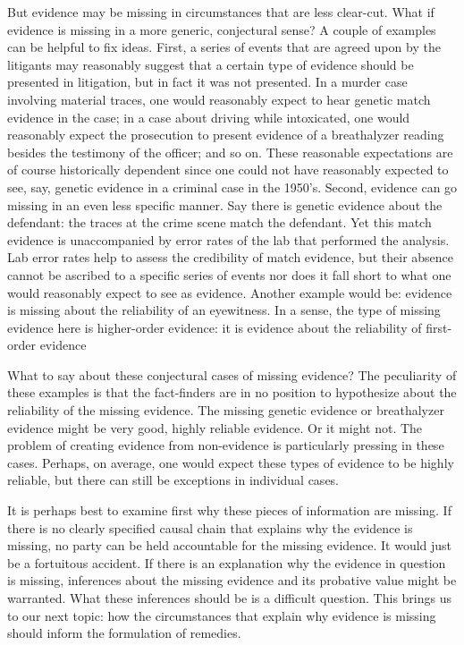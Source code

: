 \documentclass[
  10pt,
  dvipsnames,enabledeprecatedfontcommands]{scrartcl}
\begin{document}
But evidence may be missing in circumstances that are less clear-cut.
What if evidence is missing in a more generic, conjectural sense? A
couple of examples can be helpful to fix ideas. First, a series of
events that are agreed upon by the litigants may reasonably suggest that
a certain type of evidence should be presented in litigation, but in
fact it was not presented. In a murder case involving material traces,
one would reasonably expect to hear genetic match evidence in the case;
in a case about driving while intoxicated, one would reasonably expect
the prosecution to present evidence of a breathalyzer reading besides
the testimony of the officer; and so on. These reasonable expectations
are of course historically dependent since one could not have reasonably
expected to see, say, genetic evidence in a criminal case in the 1950's.
Second, evidence can go missing in an even less specific manner. Say
there is genetic evidence about the defendant: the traces at the crime
scene match the defendant. Yet this match evidence is unaccompanied by
error rates of the lab that performed the analysis. Lab error rates help
to assess the credibility of match evidence, but their absence cannot be
ascribed to a specific series of events nor does it fall short to what
one would reasonably expect to see as evidence. Another example would
be: evidence is missing about the reliability of an eyewitness. In a
sense, the type of missing evidence here is higher-order evidence: it is
evidence about the reliability of first-order evidence

What to say about these conjectural cases of missing evidence? The
peculiarity of these examples is that the fact-finders are in no
position to hypothesize about the reliability of the missing evidence.
The missing genetic evidence or breathalyzer evidence might be very
good, highly reliable evidence. Or it might not. The problem of creating
evidence from non-evidence is particularly pressing in these cases.
Perhaps, on average, one would expect these types of evidence to be
highly reliable, but there can still be exceptions in individual cases.

It is perhaps best to examine first why these pieces of information are
missing. If there is no clearly specified causal chain that explains why
the evidence is missing, no party can be held accountable for the
missing evidence. It would just be a fortuitous accident. If there is an
explanation why the evidence in question is missing, inferences about
the missing evidence and its probative value might be warranted. What
these inferences should be is a difficult question. This brings us to
our next topic: how the circumstances that explain why evidence is
missing should inform the formulation of remedies.
\end{document}
